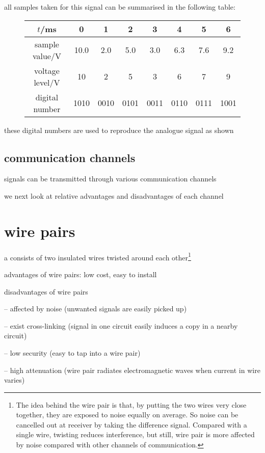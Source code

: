 all samples taken for this signal can be summarised in the following table:

\begin{figure}[ht]
	\centering
	\begin{tabular}{|c|c|c|c|c|c|c|c|}
		\hline
		$t$/ms & 0 & 1 & 2 & 3 & 4 & 5 & 6 \\ \hline
		sample value/V & 10.0 & 2.0 & 5.0 & 3.0 & 6.3 & 7.6 & 9.2 \\ \hline
		voltage level/V & 10 & 2 & 5 & 3 & 6 & 7 & 9 \\ \hline
		digital number & 1010 & 0010 & 0101 & 0011 & 0110 & 0111 & 1001 \\ \hline
	\end{tabular}
\end{figure}

these digital numbers are used to reproduce the analogue signal as shown \eoe






\subsection{communication channels}

signals can be transmitted through various communication channels

we next look at relative advantages and disadvantages of each channel

\section{wire pairs}

a  consists of two insulated wires twisted around each other\footnote{The idea behind the wire pair is that, by putting the two wires very close together, they are exposed to noise equally on average. So noise can be cancelled out at receiver by taking the difference signal. Compared with a single wire, twisting reduces interference, but still, wire pair is more affected by noise compared with other channels of communication.}

\cmt advantages of wire pairs: low cost, easy to install

\cmt disadvantages of wire pairs

\begin{compactitem}
	\item[--] affected by noise (unwanted signals are easily picked up)
	
	\item[--] exist cross-linking (signal in one circuit easily induces a copy in a nearby circuit)
	
	\item[--] low security (easy to tap into a wire pair)
	
	\item[--] high attenuation (wire pair radiates electromagnetic waves when current in wire varies)
\end{compactitem}

